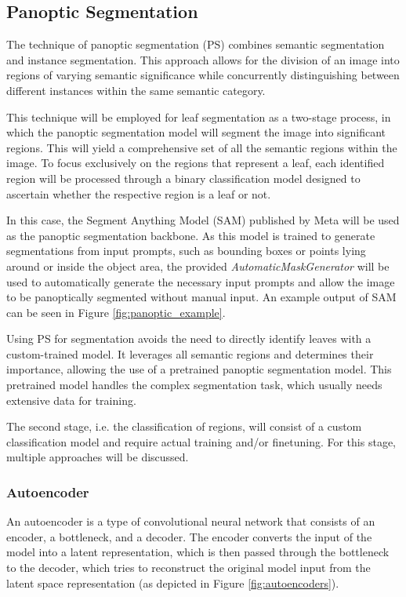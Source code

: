 \documentclass[draft,final]{vutinfth} %
\begin{document}
\subsection{Panoptic Segmentation} \label{sec:meth_panoptic}
The technique of panoptic segmentation (PS) combines semantic segmentation and instance segmentation. This approach allows for the division of an image into regions of varying semantic significance while concurrently distinguishing between different instances within the same semantic category.

This technique will be employed for leaf segmentation as a two-stage process, in which the panoptic segmentation model will segment the image into significant regions. This will yield a comprehensive set of all the semantic regions within the image. To focus exclusively on the regions that represent a leaf, each identified region will be processed through a binary classification model designed to ascertain whether the respective region is a leaf or not.

In this case, the Segment Anything Model (SAM) \cite{kirillov_segment_2023} published by Meta will be used as the panoptic segmentation backbone. As this model is trained to generate segmentations from input prompts, such as bounding boxes or points lying around or inside the object area, the provided \textit{AutomaticMaskGenerator} will be used to automatically generate the necessary input prompts and allow the image to be panoptically segmented without manual input. An example output of SAM can be seen in Figure \ref{fig:panoptic_example}.

Using PS for segmentation avoids the need to directly identify leaves with a custom-trained model. It leverages all semantic regions and determines their importance, allowing the use of a pretrained panoptic segmentation model. This pretrained model handles the complex segmentation task, which usually needs extensive data for training.

The second stage, i.e. the classification of regions, will consist of a custom classification model and require actual training and/or finetuning. For this stage, multiple approaches will be discussed.

\subsubsection{Autoencoder} \label{sec:method_autoencoder}
An autoencoder is a type of convolutional neural network that consists of an encoder, a bottleneck, and a decoder. The encoder converts the input of the model into a latent representation, which is then passed through the bottleneck to the decoder, which tries to reconstruct the original model input from the latent space representation (as depicted in Figure \ref{fig:autoencoders}). 
\end{document}
